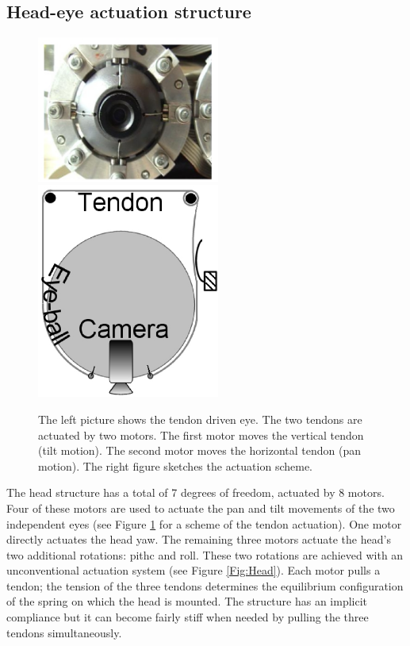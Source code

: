 \subsection{Head-eye actuation structure}

\begin{figure}[h!tbp]
  \centering
  \includegraphics[width=60mm]{Figure/EyePhoto.eps}
  \includegraphics[width=60mm]{Figure/EyeSection.eps}\\
  \caption{The left picture shows the tendon driven eye. The
 two tendons are actuated by two motors. The first motor moves the vertical
  tendon (tilt motion). The second motor moves the horizontal tendon (pan motion). The
  right figure sketches the actuation scheme.}\label{Fig:EyeSection}
\end{figure}

The head structure has a total of 7 degrees of freedom, actuated by 8 motors. Four of these motors are used to actuate the pan and tilt movements of the two independent eyes (see Figure \ref{Fig:EyeSection} for a scheme of the tendon actuation). One motor directly actuates the head yaw. The remaining three motors actuate the head's two additional rotations: pithc and roll. These two rotations are achieved with an unconventional actuation system (see Figure \ref{Fig:Head}). Each motor pulls a tendon; the tension of the three tendons determines the equilibrium configuration of the spring on which the head is mounted. The structure has an implicit compliance but it can become fairly stiff when needed by pulling the three tendons simultaneously.

